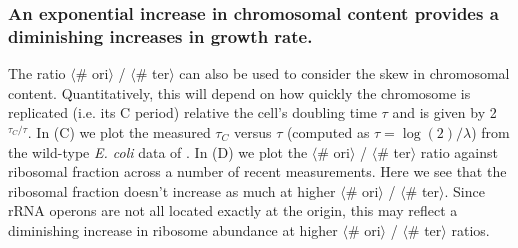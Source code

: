 \subsubsection{An exponential increase in chromosomal content provides a diminishing
increases in growth rate.}

The ratio $\langle$\# ori$\rangle$ / $\langle$\# ter$\rangle$ can also be used
to consider the skew in chromosomal content. Quantitatively, this will depend on
how quickly the chromosome is replicated (i.e. its C period) relative the cell's
doubling time $\tau$ and is given by 2$^{\tau_C / \tau}$. In
(C) we plot the measured $\tau_C$ versus $\tau$
(computed as $\tau = \log (2) / \lambda$) from the wild-type \textit{E. coli}
data of \citep{si2017}. In (D) we plot the
$\langle$\# ori$\rangle$ / $\langle$\# ter$\rangle$ ratio against ribosomal
fraction across a number of recent measurements. Here we see that the ribosomal
fraction doesn't increase as much at higher $\langle$\# ori$\rangle$ /
$\langle$\# ter$\rangle$. Since rRNA operons are not all located exactly at the
origin,  this may reflect a diminishing increase in ribosome abundance at higher
$\langle$\# ori$\rangle$ / $\langle$\# ter$\rangle$ ratios.




